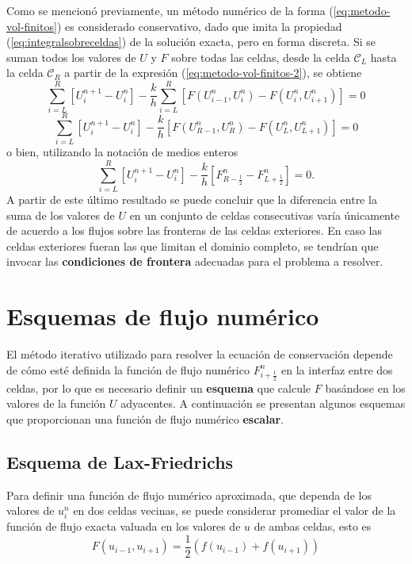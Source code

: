 Como se mencionó previamente, un método numérico de la forma (\ref{eq:metodo-vol-finitos}) es considerado conservativo, dado que imita la propiedad (\ref{eq:integralsobreceldas}) de la solución exacta, pero en forma discreta. Si se suman todos los valores de $U$ y $F$ sobre todas las celdas, desde la celda $\mathcal{C}_L$ hasta la celda $\mathcal{C}_R$ a partir de la expresión (\ref{eq:metodo-vol-finitos-2}), se obtiene
\begin{equation}
 \sum_{i=L}^{R}\left[U_{i}^{n+1}-U_{i}^{n}\right] - 
 \frac{k}{h}\sum_{i=L}^{R}\left[ F(U_{i-1}^n, U_i^n) - F(U_{i}^n, U_{i+1}^n) \right] = 0
\end{equation}
\begin{equation}
	\sum_{i=L}^{R}\left[U_{i}^{n+1}-U_{i}^{n}\right] - 
	\frac{k}{h}\left[F(U_{R-1}^n, U_{R}^n) - F(U_{L}^n, U_{L+1}^n) \right] = 0
\end{equation}
o bien, utilizando la notación de medios enteros
\begin{equation}
	\sum_{i=L}^{R}\left[U_{i}^{n+1}-U_{i}^{n}\right] - \frac{k}{h}\left[F_{R-\frac{1}{2}}^{n} - F_{L+\frac{1}{2}}^{n} \right] = 0.
\end{equation}
A partir de este último resultado se puede concluir que la diferencia entre la suma de los valores de $U$ en un conjunto de celdas consecutivas varía únicamente de acuerdo a los flujos sobre las fronteras de las celdas exteriores. En caso las celdas exteriores fueran las que limitan el dominio completo, se tendrían que invocar las \textbf{condiciones de frontera} adecuadas para el problema a resolver.

\section{Esquemas de flujo numérico}
El método iterativo utilizado para resolver la ecuación de conservación depende de cómo esté definida la función de flujo numérico $F_{i + \frac{1}{2}}^{n}$ en la interfaz entre dos celdas, por lo que es necesario definir un \textbf{esquema} que calcule $F$ basándose en los valores de la función $U$ adyacentes. A continuación se presentan algunos esquemas que proporcionan una función de flujo numérico \textbf{escalar}.

\subsection{Esquema de Lax-Friedrichs}
Para definir una función de flujo numérico aproximada, que dependa de los valores de $u_{i}^{n}$ en dos celdas vecinas, se puede considerar promediar el valor de la función de flujo exacta valuada en los valores de $u$ de ambas celdas, esto es
\begin{equation}
	F(u_{i-1}, u_{i+1}) = \frac{1}{2}\left(f(u_{i-1}) + f(u_{i+	1})\right)
\end{equation}


